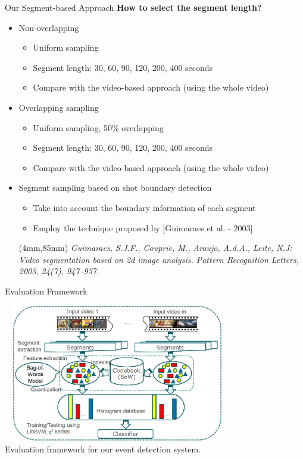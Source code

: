 \documentclass{beamer}
\newenvironment{reference}[2]{%
  \begin{textblock*}{\textwidth}(#1,#2) 
      \footnotesize\it\bgroup\color{red!50!black}}{\egroup\end{textblock*}}
\begin{document}
\begin{frame}[t]{Our Segment-based Approach}
\textbf{How to select the segment length?}
\begin{itemize}
\item Non-overlapping
\begin{itemize}
	\item Uniform sampling
	\item Segment length: 30, 60, 90, 120, 200, 400 seconds 
	\item Compare with the video-based approach (using the whole video)
\end{itemize}
\item Overlapping sampling
	\begin{itemize}
	\item Uniform sampling, 50\% overlapping
	\item Segment length: 30, 60, 90, 120, 200, 400 seconds 
	\item Compare with the video-based approach (using the whole video)
	\end{itemize}
\item Segment sampling based on shot boundary detection
	\begin{itemize}
	\item Take into account the boundary information of each segment
	\item Employ the technique proposed by [Guimaraes et al. - 2003]
	\end{itemize}
	
\begin{reference}{4mm}{85mm}
Guimaraes, S.J.F., Couprie, M., Araujo, A.d.A., Leite, N.J: Video segmentation based on 2d image analysis. Pattern Recognition Letters, 2003, 24(7), 947–957.
\end{reference} 
	
\end{itemize}

\end{frame}

\begin{frame}[t]{Evaluation Framework}
\begin{center}
\includegraphics[width=10cm,height=6cm]{images/framework2.jpg}
\\
Evaluation framework for our event detection system.
\end{center}

\end{frame}
\end{document}
